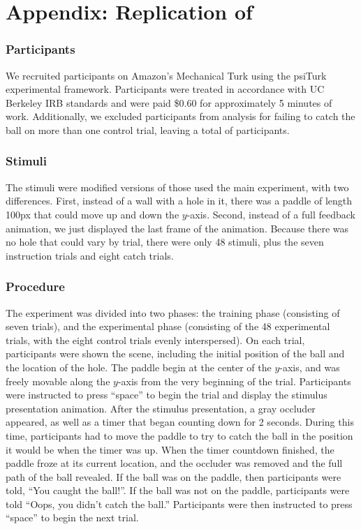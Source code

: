 \documentclass[10pt,letterpaper]{article}
\begin{document}
\section{Appendix: Replication of }

\subsubsection{Participants}

We recruited \PaddleNumComplete{} participants on Amazon's Mechanical Turk using the psiTurk \cite{McDonnell12} experimental framework.
Participants were treated in accordance with UC Berkeley IRB standards and were paid \$0.60 for approximately 5 minutes of work.
Additionally, we excluded \PaddleNumFailed{} participants from analysis for failing to catch the ball on more than one control trial, leaving a total of \PaddleNumOk{} participants.

\subsubsection{Stimuli}

The stimuli were modified versions of those used the main experiment, with two differences.
First, instead of a wall with a hole in it, there was a paddle of length 100px that could move up and down the $y$-axis.
Second, instead of a full feedback animation, we just displayed the last frame of the animation.
Because there was no hole that could vary by trial, there were only 48 stimuli, plus the seven instruction trials and eight catch trials.

\subsubsection{Procedure}

The experiment was divided into two phases: the training phase (consisting of seven trials), and the experimental phase (consisting of the 48 experimental trials, with the eight control trials evenly interspersed).
On each trial, participants were shown the scene, including the initial position of the ball and the location of the hole.
The paddle begin at the center of the $y$-axis, and was freely movable along the $y$-axis from the very beginning of the trial.
Participants were instructed to press ``space'' to begin the trial and display the stimulus presentation animation.
After the stimulus presentation, a gray occluder appeared, as well as a timer that began counting down for 2 seconds.
During this time, participants had to move the paddle to try to catch the ball in the position it would be when the timer was up.
When the timer countdown finished, the paddle froze at its current location, and the occluder was removed and the full path of the ball revealed.
If the ball was on the paddle, then participants were told, ``You caught the ball!''.
If the ball was not on the paddle, participants were told ``Oops, you didn't catch the ball.''
Participants were then instructed to press ``space'' to begin the next trial.
\end{document}
